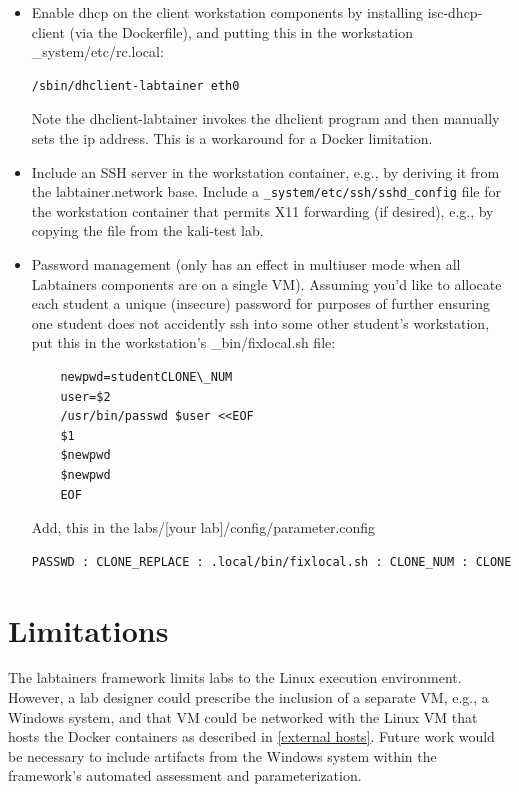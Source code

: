 \documentclass[12pt]{article}
\begin{document}
\begin{itemize}
\item Enable dhcp on the client workstation components by installing isc-dhcp-client
(via the Dockerfile), and putting this in the workstation \_system/etc/rc.local:
\begin{verbatim}
/sbin/dhclient-labtainer eth0
\end{verbatim}
\noindent Note the dhclient-labtainer invokes the dhclient program and then
manually sets the ip address.  This is a workaround for a Docker limitation.

\item Include an SSH server in the workstation container, e.g., by deriving it from the labtainer.network base.
Include a {\tt \_system/etc/ssh/sshd\_config} file for the workstation container that permits X11 forwarding (if desired),
e.g., by copying the file from the kali-test lab.

\item Password management (only has an effect in multiuser mode when all Labtainers components are on a single VM). 
Assuming you'd like to allocate each student a unique (insecure) password for purposes of
further ensuring one student does not accidently ssh into some other student's workstation, put
this in the workstation's \_bin/fixlocal.sh file:
\begin{verbatim}
    newpwd=studentCLONE\_NUM
    user=$2
    /usr/bin/passwd $user <<EOF
    $1
    $newpwd
    $newpwd
    EOF
\end{verbatim}

\noindent Add, this in the labs/[your lab]/config/parameter.config
\begin{verbatim}
PASSWD : CLONE_REPLACE : .local/bin/fixlocal.sh : CLONE_NUM : CLONE
\end{verbatim}

\end{itemize}

\section{Limitations} \label{limitations}
The labtainers framework limits labs to the Linux execution environment.
However, a lab designer could prescribe the inclusion of a separate
VM, e.g., a Windows system, and that VM could be networked with the Linux
VM that hosts the Docker containers as described in \ref{external hosts}.  
Future work would be necessary to include
artifacts from the Windows system within the framework's automated assessment
and parameterization.
\end{document}
